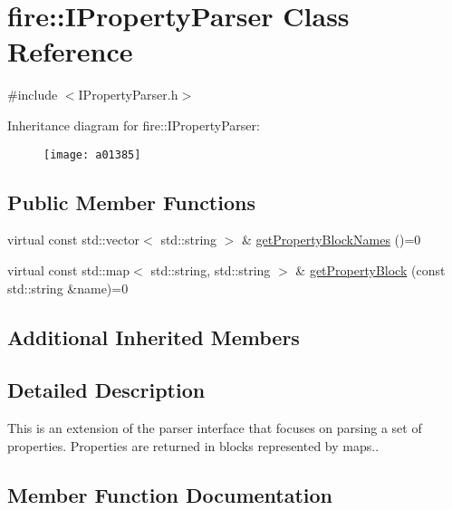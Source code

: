 \hypertarget{a01385}{}\section{fire\+:\+:I\+Property\+Parser Class Reference}
\label{a01385}


{\ttfamily \#include $<$I\+Property\+Parser.\+h$>$}

Inheritance diagram for fire\+:\+:I\+Property\+Parser\+:\begin{figure}[H]
\begin{center}
\leavevmode
\texttt{[image: a01385]}
\end{center}
\end{figure}
\subsection*{Public Member Functions}
\begin{DoxyCompactItemize}
\item 
virtual const std\+::vector$<$ std\+::string $>$ \& \hyperlink{a01385_a34602687f9d1affac7bd842102d4a6aa}{get\+Property\+Block\+Names} ()=0
\item 
virtual const std\+::map$<$ std\+::string, std\+::string $>$ \& \hyperlink{a01385_a34201371cb36dd09e96a66242ececb86}{get\+Property\+Block} (const std\+::string \&name)=0
\end{DoxyCompactItemize}
\subsection*{Additional Inherited Members}


\subsection{Detailed Description}
This is an extension of the parser interface that focuses on parsing a set of properties. Properties are returned in blocks represented by maps.. 

\subsection{Member Function Documentation}
\mbox{\label{a01385_a34201371cb36dd09e96a66242ececb86}} 
